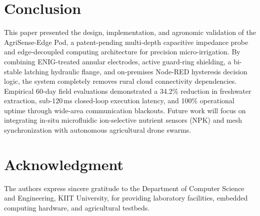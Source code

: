 \documentclass[journal,10pt,twocolumn]{IEEEtran}
\begin{document}
\section{Conclusion}
This paper presented the design, implementation, and agronomic validation of the AgriSense-Edge Pod\texttrademark, a patent-pending multi-depth capacitive impedance probe and edge-decoupled computing architecture for precision micro-irrigation. By combining ENIG-treated annular electrodes, active guard-ring shielding, a bi-stable latching hydraulic flange, and on-premises Node-RED hysteresis decision logic, the system completely removes rural cloud connectivity dependencies. Empirical 60-day field evaluations demonstrated a 34.2\% reduction in freshwater extraction, sub-120\,ms closed-loop execution latency, and 100\% operational uptime through wide-area communication blackouts. Future work will focus on integrating in-situ microfluidic ion-selective nutrient sensors (NPK) and mesh synchronization with autonomous agricultural drone swarms.

\balance
\section*{Acknowledgment}
The authors express sincere gratitude to the Department of Computer Science and Engineering, KIIT University, for providing laboratory facilities, embedded computing hardware, and agricultural testbeds.



\end{document}
